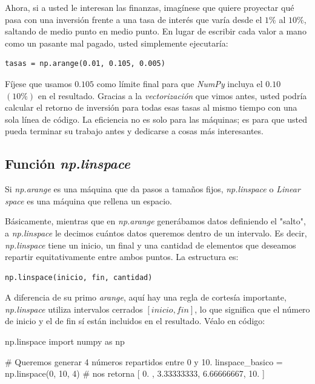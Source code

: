 Ahora, si a usted le interesan las finanzas, imagínese que quiere proyectar qué pasa con una inversión frente a una tasa de interés que varía desde el \(1\%\) al \(10\%\), saltando de medio punto en medio punto. En lugar de escribir cada valor a mano como un pasante mal pagado, usted simplemente ejecutaría:

\begin{verbatim}
tasas = np.arange(0.01, 0.105, 0.005)
\end{verbatim}

Fíjese que usamos \(0.105\) como límite final para que \textit{NumPy} incluya el \(0.10\) \((10\%)\) en el resultado. Gracias a la \textit{vectorización} que vimos antes, usted podría calcular el retorno de inversión para todas esas tasas al mismo tiempo con una sola línea de código. La eficiencia no es solo para las máquinas; es para que usted pueda terminar su trabajo antes y dedicarse a cosas más interesantes.



\subsection{Función \textit{np.linspace}}

Si \textit{np.arange} es una máquina que da pasos a tamaños fijos, \textit{np.linspace} o \textit{Linear space} es una máquina que rellena un espacio.

Básicamente, mientras que en \textit{np.arange} generábamos datos definiendo el "salto", a \textit{np.linspace} le decimos cuántos datos queremos dentro de un intervalo. Es decir, \textit{np.linspace} tiene un inicio, un final y una cantidad de elementos que deseamos repartir equitativamente entre ambos puntos. La estructura es:

\begin{verbatim}
np.linspace(inicio, fin, cantidad)
\end{verbatim}

A diferencia de su primo \textit{arange}, aquí hay una regla de cortesía importante, \textit{np.linspace} utiliza intervalos cerrados \([inicio,fin]\), lo que significa que el número de inicio y el de fin sí están incluidos en el resultado. Véalo en código:

\begin{pycode}{np.linspace}
import numpy as np 

# Queremos generar 4 números repartidos entre 0 y 10.
linspace_basico = np.linspace(0, 10, 4) # nos retorna [ 0. , 3.33333333, 6.66666667, 10. ]

\end{pycode}

